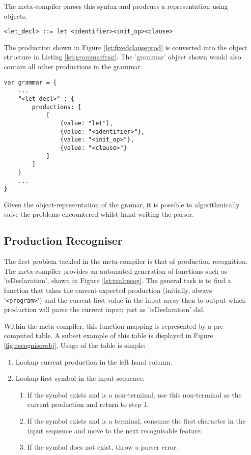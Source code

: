 \documentclass{article}
\begin{document}
The meta-compiler parses this syntax and prodcues a representation using objects.

\begin{lstlisting}[caption={Simple production},label={lst:fixedclauseprod}]
<let_decl> ::= let <identifier><init_op><clause>
\end{lstlisting}


The production shown in Figure \ref{lst:fixedclauseprod} is converted into the object structure in Listing \ref{lst:grammarfrag}. The 'grammar' object shown would also contain all other productions in the grammar.

\begin{lstlisting}[caption=TODO, label={lst:grammarfrag}]
var grammar = {
	...
	"<let_decl>" : { 
		productions: [
			[
			    {value: "let"},
			    {value: "<identifier>"},
			    {value: "<init_op>"},
			    {value: "<clause>"}
		    ]
		]
	}
	...
}
\end{lstlisting}

Given the object-representation of the gramar, it is possible to algorithmically solve the problems encountered whilst hand-writing the parser.

\subsection{Production Recogniser}

The first problem tackled in the meta-compiler is that of production recognition. The meta-compiler provides an automated generation of functions such as 'isDeclaration', shown in Figure \ref{lst:realrecog}. The general task is to find a function that takes the current expected production (initially, always '\lstinline{<program>}') and the current first value in the input array then to output which production will parse the current input; just as 'isDeclaration' did.

Within the meta-compiler, this function mapping is represented by a pre-computed table. A subset example of this table is displayed in Figure \ref{fig:recogniserobj}. Usage of the table is simple:

\begin{enumerate}
\item Lookup current production in the left hand column.
\item Lookup first symbol in the input sequence.
\begin{enumerate}
\item If the symbol exists and is a non-terminal, use this non-terminal as the current production and return to step 1.
\item If the symbol exists and is a terminal, consume the first character in the input sequence and move to the next recognisable feature.
\item If the symbol does not exist, throw a parser error.
\end{enumerate}
\end{enumerate}
\end{document}

